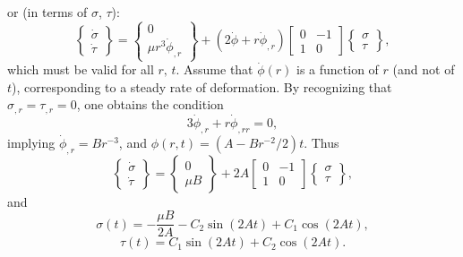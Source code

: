 or (in terms of $\sigma$, $\tau$):
\begin{equation}
  \left\{ \begin{array}{c} \dot{\sigma} \\ \dot{\tau} \end{array} \right\} = \left\{ \begin{array}{c} 0 \\ \mu r^3 \dot{\phi}_{,r} \end{array} \right\} + (2 \dot{\phi} + r \dot{\phi}_{,r}) \left[ \begin{array}{cc} 0 & -1 \\ 1 & 0 \end{array} \right] \left\{ \begin{array}{c} \sigma \\ \tau \end{array} \right\},
\end{equation}
which must be valid for all $r, \, t$. Assume that $\dot{\phi}(r)$ is a function of $r$ (and not of $t$), corresponding to a steady rate of deformation. By recognizing that $\sigma_{,r} = \tau_{,r} = 0$, one obtains the condition
\begin{equation}
  3 \dot{\phi}_{,r} + r \dot{\phi}_{,rr} = 0,
\end{equation}
implying $\dot{\phi}_{,r} = B r^{-3}$, and $\phi (r, t) = (A - B r^{-2} / 2)t$. Thus
\begin{equation}
  \left\{ \begin{array}{c} \dot{\sigma} \\ \dot{\tau} \end{array} \right\} = \left\{ \begin{array}{c} 0 \\ \mu B \end{array} \right\} + 2 A \left[ \begin{array}{cc} 0 & -1 \\ 1 & 0 \end{array} \right] \left\{ \begin{array}{c} \sigma \\ \tau \end{array} \right\},
\end{equation}
and
\begin{equation}
  \sigma(t) = - \frac{\mu B}{2 A} - C_2 \sin (2 A t) + C_1 \cos (2 A t),
\end{equation}
\begin{equation}
  \tau(t) = C_1 \sin (2 A t) + C_2 \cos (2 A t).
\end{equation}
